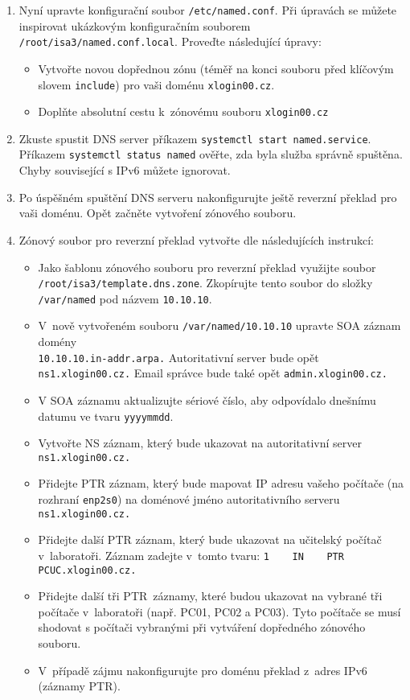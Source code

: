 \begin{enumerate}
  \item Nyní upravte konfigurační soubor {\tt /etc/named.conf}. Při úpravách se můžete inspirovat ukázkovým konfiguračním souborem {\tt /root/isa3/named.conf.local}. Proveďte následující úpravy:
    \begin{itemize}
      \item Vytvořte novou dopřednou zónu (téměř na konci souboru před klíčovým slovem {\tt include}) pro vaši doménu {\tt xlogin00.cz}.
            \item Doplňte absolutní cestu k~zónovému souboru \texttt{xlogin00.cz}
    \end{itemize}
  \item Zkuste spustit DNS server příkazem {\tt systemctl start named.service}.
    Příkazem {\tt systemctl status named} ověřte, zda byla služba správně spuštěna. Chyby související s IPv6 můžete ignorovat.
  
  \item Po úspěšném spuštění DNS serveru nakonfigurujte ještě reverzní překlad pro vaši doménu. Opět začněte vytvoření zónového souboru. 
  

  
  \item Zónový soubor pro reverzní překlad vytvořte dle následujících instrukcí:
    \begin{itemize}
      \item Jako šablonu zónového souboru pro reverzní překlad využijte soubor {\tt /root/isa3/temp\-late.dns.zone}.
            Zkopírujte tento soubor do složky {\tt /var/named} pod názvem \texttt{10.10.10}.
      \item V~nově vytvořeném souboru {\tt /var/named/10.10.10} upravte SOA záznam domény\\ {\tt 10.10.10.in-addr.arpa.} Autoritativní server bude opět {\tt ns1.xlogin00.cz.}
            Email správce bude také opět {\tt admin.xlogin00.cz.}
      \item V SOA záznamu aktualizujte sériové číslo, aby odpovídalo dnešnímu datumu ve tvaru {\tt yyyymmdd}.
      \item Vytvořte NS záznam, který bude ukazovat na autoritativní server {\tt ns1.xlogin00.cz.}
      \item Přidejte PTR záznam, který bude mapovat IP adresu vašeho počítače (na rozhraní {\tt enp2s0}) na doménové jméno autoritativního serveru {\tt ns1.xlogin00.cz.}
      \item Přidejte další PTR záznam, který bude ukazovat na učitelský počítač v~laboratoři. Záznam zadejte v~tomto tvaru:
            \verb|1    IN    PTR    PCUC.xlogin00.cz.|
      \item Přidejte další tři PTR~záznamy, které budou ukazovat na vybrané tři počítače v~laboratoři (např. PC01, PC02 a PC03). Tyto počítače se musí shodovat s počítači vybranými při vytváření dopředného zónového souboru.
      \item V~případě zájmu nakonfigurujte pro doménu překlad z~adres IPv6 (záznamy PTR).
    \end{itemize} 


\end{enumerate}
